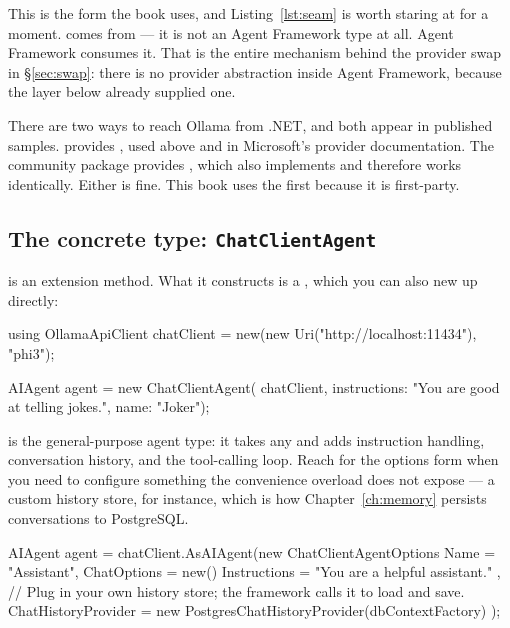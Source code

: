 This is the form the book uses, and Listing~\ref{lst:seam} is worth staring at
for a moment.  comes from  --- it
is not an Agent Framework type at all. Agent Framework consumes it. That is the
entire mechanism behind the provider swap in \S\ref{sec:swap}: there is no
provider abstraction inside Agent Framework, because the layer below already
supplied one.

\begin{note}
There are two ways to reach Ollama from .NET, and both appear in published
samples.  provides ,
used above and in Microsoft's provider documentation. The community
 package provides , which also implements
 and therefore works identically. Either is fine. This book uses
the first because it is first-party.
\end{note}

\subsection{The concrete type: \texorpdfstring{\texttt{ChatClientAgent}}{ChatClientAgent}}

 is an extension method. What it constructs is a
, which you can also new up directly:

\begin{csharp}[caption={The same agent, constructed explicitly}, label={lst:chatclientagent}]
using OllamaApiClient chatClient = new(new Uri("http://localhost:11434"), "phi3");

AIAgent agent = new ChatClientAgent(
    chatClient,
    instructions: "You are good at telling jokes.",
    name: "Joker");
\end{csharp}

 is the general-purpose agent type: it takes any
 and adds instruction handling, conversation history, and the
tool-calling loop. Reach for the options form when you need to configure
something the convenience overload does not expose --- a custom history store,
for instance, which is how Chapter~\ref{ch:memory} persists conversations to
PostgreSQL.

\begin{csharp}[caption={The options form, used from Chapter~\ref{ch:memory} onward}, label={lst:agent-options}]
AIAgent agent = chatClient.AsAIAgent(new ChatClientAgentOptions
{
    Name = "Assistant",
    ChatOptions = new()
    {
        Instructions = "You are a helpful assistant."
    },
    // Plug in your own history store; the framework calls it to load and save.
    ChatHistoryProvider = new PostgresChatHistoryProvider(dbContextFactory)
});
\end{csharp}


